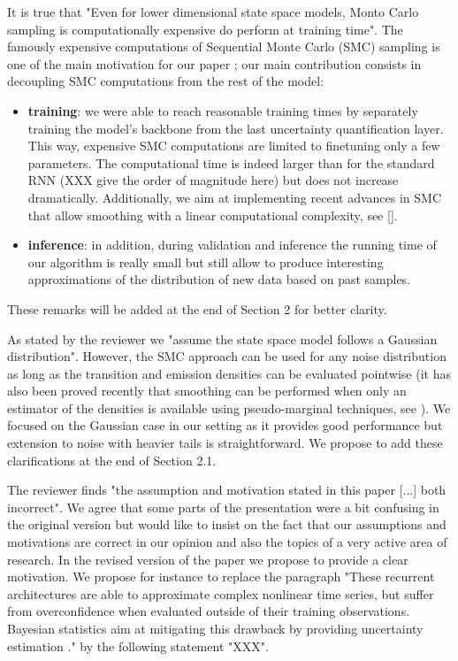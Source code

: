 \documentclass{article}
\begin{document}
It is true that  "Even for lower dimensional state space
models, Monto Carlo sampling is computationally expensive do perform at training time". The famously expensive computations of Sequential Monte Carlo (SMC) sampling is one of the main motivation for our paper ;
our main contribution consists in decoupling SMC computations from the rest of the model:
\begin{itemize}
	\item \textbf{training}: we were able to reach reasonable training times by separately training the model's backbone from the last uncertainty quantification layer.
		This way, expensive SMC computations are limited to finetuning only a few parameters. The computational time is indeed larger than for the standard RNN (XXX give the order of magnitude here) but does not increase dramatically.
		Additionally, we aim at implementing recent advances in SMC that allow smoothing with a linear computational complexity, see [].
	\item \textbf{inference}:  in addition, during validation and inference the running time of our algorithm is really small but still allow to produce interesting approximations of the distribution of new data based on past samples. 
\end{itemize}
These remarks will be added at the end of Section 2 for better clarity.

As stated by the reviewer we "assume the state space model follows a Gaussian distribution". However, the SMC approach can be used for any noise distribution as long as the transition and emission densities can be evaluated pointwise (it has also been proved recently that smoothing can be performed when only an estimator of the densities is available using pseudo-marginal techniques, see \cite{papier gloaguen lecorff Olsson}). We focused on the Gaussian case  in our setting as it provides good performance but extension to noise with heavier tails is straightforward. We propose to add these clarifications at the end of Section 2.1.

The reviewer finds "the assumption and motivation stated in
this paper [...] both incorrect". We agree that some parts of the presentation were a bit confusing in the original version but would like to insist on the fact that our assumptions and motivations are correct in our opinion and also the topics of a very active area of research.  In the revised version of the paper we propose to provide a clear motivation. We propose for instance to replace the paragraph "These recurrent architectures are able to approximate complex nonlinear time series, but suffer from overconfidence when evaluated outside of their training observations.
Bayesian statistics aim at mitigating this drawback by providing uncertainty estimation \cite{Hinton1995BayesianLF}." by the following statement "XXX".
\end{document}
